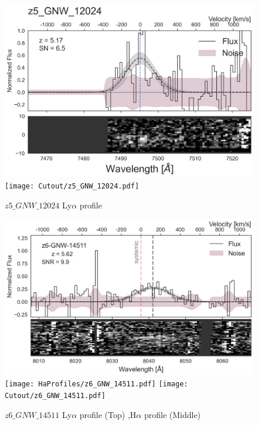 \documentclass[12pt,english]{article}
\begin{document}
\begin{figure}
\begin{center}\includegraphics[width=12cm, trim=0.1cm 0cm 0cm -1cm]{LyaProfiles/z5_GNW_12024.png}
\texttt{[image: Cutout/z5\_GNW\_12024.pdf]}
\caption{$z5\_GNW\_12024$ Ly$\alpha$ profile}
\end{center}
\end{figure}
\clearpage
\begin{figure}
\begin{center}\includegraphics[width=12cm, trim=0.1cm 0cm 0cm -1cm]{LyaProfiles/z6_GNW_14511.png}
\texttt{[image: HaProfiles/z6\_GNW\_14511.pdf]}
\texttt{[image: Cutout/z6\_GNW\_14511.pdf]}
\caption{$z6\_GNW\_14511$ Ly$\alpha$ profile (Top) ,H$\alpha$ profile (Middle)}
\end{center}
\end{figure}
\clearpage
\end{document}

